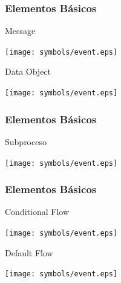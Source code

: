 \documentclass[a4paper,slidestop,xcolor=pst,blue]{beamer}
\begin{document}
\begin{frame}[c]
    \frametitle{Elementos Básicos}
    \begin{block}{Message}
        \ \\
        \begin{center}
            \texttt{[image: symbols/event.eps]}
        \end{center}
    \end{block}
    \begin{block}{Data Object}
        \ \\
        \begin{center}
            \texttt{[image: symbols/event.eps]}
        \end{center}
    \end{block}
\end{frame}

\begin{frame}[c]
    \frametitle{Elementos Básicos}
    \begin{block}{Subproceso}
        \ \\
        \begin{center}
            \texttt{[image: symbols/event.eps]}
        \end{center}
    \end{block}
\end{frame}

\begin{frame}[c]
    \frametitle{Elementos Básicos}
    \begin{block}{Conditional Flow}
        \ \\
        \begin{center}
            \texttt{[image: symbols/event.eps]}
        \end{center}
    \end{block}
    \begin{block}{Default Flow}
        \ \\
        \begin{center}
            \texttt{[image: symbols/event.eps]}
        \end{center}
    \end{block}
\end{frame}
\end{document}
